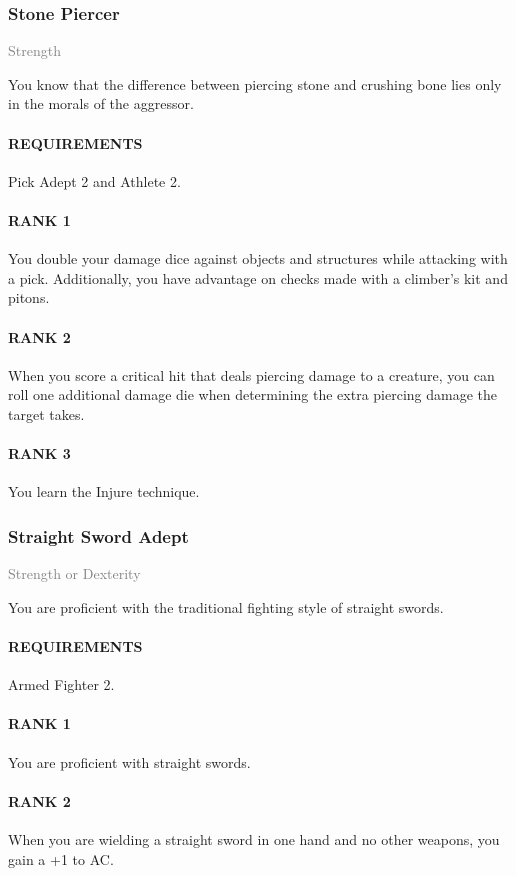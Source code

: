 \subsubsection{Stone Piercer} \label{feat::stonepiercer}
\small{\textcolor{gray}{Strength}}

\normalsize
You know that the difference between piercing stone and crushing bone lies only in the morals of the aggressor.
\paragraph{REQUIREMENTS} Pick Adept 2 and Athlete 2.
\paragraph{RANK 1} You double your damage dice against objects and structures while attacking with a pick.
Additionally, you have advantage on checks made with a climber's kit and pitons.
\paragraph{RANK 2} When you score a critical hit that deals piercing damage to a creature, you can roll one additional damage die when determining the extra piercing damage the target takes.
\paragraph{RANK 3} You learn the Injure technique.

\subsubsection{Straight Sword Adept} \label{feat::straightswordadept}
\small{\textcolor{gray}{Strength or Dexterity}}

\normalsize
You are proficient with the traditional fighting style of straight swords.
\paragraph{REQUIREMENTS} Armed Fighter 2.
\paragraph{RANK 1} You are proficient with straight swords.
\paragraph{RANK 2} When you are wielding a straight sword in one hand and no other weapons, you gain a +1 to AC.
